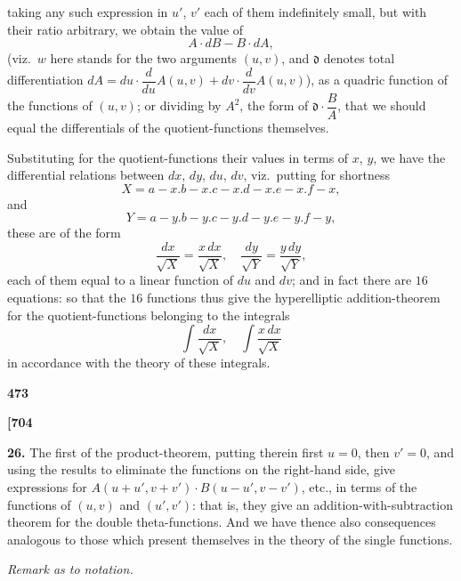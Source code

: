 \documentclass[11pt,a4paper]{book}
\begin{document}
taking any such expression in $u'$, $v'$ each of them indefinitely small, but with their ratio arbitrary, we obtain the value of
\[
A \cdot dB - B \cdot dA,
\]
(viz.\ $w$ here stands for the two arguments $(u, v)$, and $\mathfrak{d}$ denotes total differentiation $dA = du \cdot \dfrac{d}{du}A(u, v) + dv \cdot \dfrac{d}{dv}A(u, v)$), as a quadric function of the functions of $(u, v)$; or dividing by $A^2$, the form of $\mathfrak{d} \cdot \dfrac{B}{A}$, that we should equal the differentials of the quotient-functions themselves.

Substituting for the quotient-functions their values in terms of $x$, $y$, we have the differential relations between $dx$, $dy$, $du$, $dv$, viz.\ putting for shortness
\[
X = a - x . b - x . c - x . d - x . e - x . f - x,
\]
and
\[
Y = a - y . b - y . c - y . d - y . e - y . f - y,
\]
these are of the form
\[
\frac{dx}{\sqrt{X}} = \frac{x\,dx}{\sqrt{X}},\quad \frac{dy}{\sqrt{Y}} = \frac{y\,dy}{\sqrt{Y}},
\]
each of them equal to a linear function of $du$ and $dv$; and in fact there are $16$ equations: so that the $16$ functions thus give the hyperelliptic addition-theorem for the quotient-functions belonging to the integrals
\[
\int \frac{dx}{\sqrt{X}},\quad \int \frac{x\,dx}{\sqrt{X}}
\]
in accordance with the theory of these integrals.

\vspace{1em}

\begin{center}
\textbf{473}
\end{center}

\vspace{0.5em}

\noindent\textbf{[704}

\vspace{0.5em}

\noindent\textbf{26.}\quad
The first of the product-theorem, putting therein first $u = 0$, then $v' = 0$, and using the results to eliminate the functions on the right-hand side, give expressions for $A(u + u', v + v') \cdot B(u - u', v - v')$, etc., in terms of the functions of $(u, v)$ and $(u', v')$: that is, they give an addition-with-subtraction theorem for the double theta-functions. And we have thence also consequences analogous to those which present themselves in the theory of the single functions.

\vspace{1em}

\begin{center}
\textit{Remark as to notation.}
\end{center}
\end{document}
